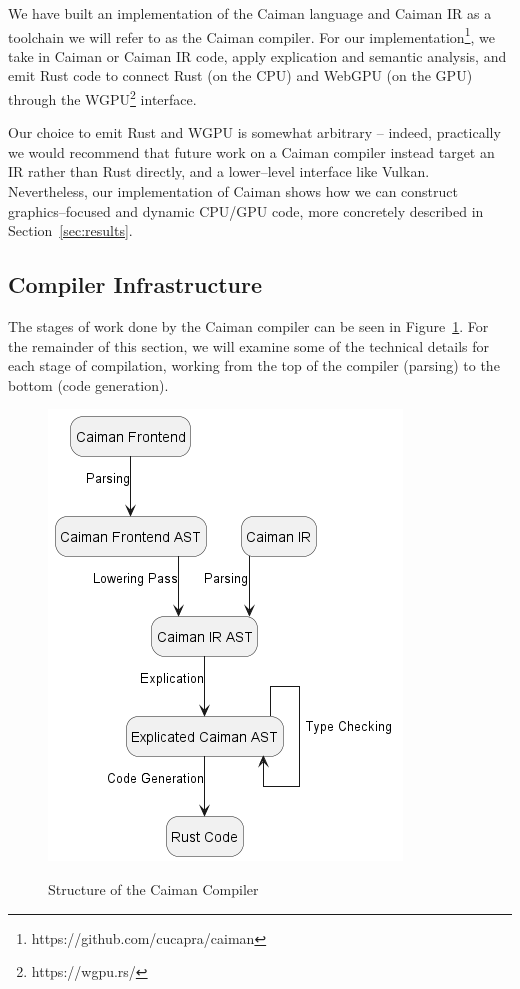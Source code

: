 We have built an implementation of the Caiman language and Caiman IR as a toolchain we will refer to as the Caiman compiler.  For our implementation\footnote{https://github.com/cucapra/caiman}, we take in Caiman or Caiman IR code, apply explication and semantic analysis, and emit Rust code to connect Rust (on the CPU) and WebGPU (on the GPU) through the WGPU\footnote{https://wgpu.rs/} interface.

Our choice to emit Rust and WGPU is somewhat arbitrary -- indeed, practically we would recommend that future work on a Caiman compiler instead target an IR rather than Rust directly, and a lower--level interface like Vulkan.  Nevertheless, our implementation of Caiman shows how we can construct graphics--focused and dynamic CPU/GPU code, more concretely described in Section~\ref{sec:results}.

\subsection{Compiler Infrastructure}
\label{subsec:compilation}

The stages of work done by the Caiman compiler can be seen in Figure~\ref{fig:caiman-compiler}.  For the remainder of this section, we will examine some of the technical details for each stage of compilation, working from the top of the compiler (parsing) to the bottom (code generation).

\begin{figure}
\includegraphics[width=.7\linewidth]{fig/caimanengineering.png}
\label{fig:caiman-compiler}
\caption{Structure of the Caiman Compiler}
\end{figure}

